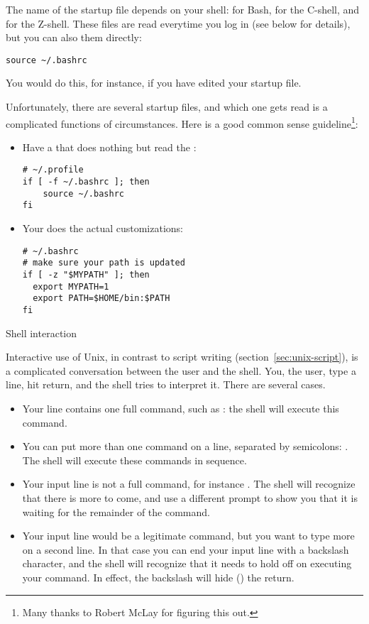 The name of the startup file depends on your shell:
 for Bash,
 for the C-shell, and
 for the Z-shell.
These files are read everytime you log in (see below for details),
but you can also  them directly:
\begin{lstlisting}
source ~/.bashrc
\end{lstlisting}
You would do this, for instance, if you have edited your startup file.

Unfortunately, there are several startup files, and which one gets read
is a complicated functions of circumstances. Here is a good common sense
guideline\footnote{Many thanks to Robert McLay for figuring this out.}:
\begin{itemize}
\item Have a  that does nothing but read the :
\begin{lstlisting}
# ~/.profile
if [ -f ~/.bashrc ]; then
    source ~/.bashrc
fi
\end{lstlisting}
\item Your  does the actual customizations:
\begin{lstlisting}
# ~/.bashrc
# make sure your path is updated
if [ -z "$MYPATH" ]; then
  export MYPATH=1
  export PATH=$HOME/bin:$PATH
fi
\end{lstlisting}
\end{itemize}


 {Shell interaction}

Interactive use of Unix, in contrast to script writing
(section~\ref{sec:unix-script}), is a complicated conversation between
the user and the shell. You, the user, type a line, hit return, and
the shell tries to interpret it. There are several cases.
\begin{itemize}
\item Your line contains one full command, such as : the
  shell will execute this command.
\item You can put more than one command on a line, separated by
  semicolons: . The shell will execute these
  commands in sequence.
\item Your input line is not a full command, for instance . The shell will recognize that there is more to come, and use
  a different prompt to show you that it is waiting for the remainder
  of the command.
\item Your input line would be a legitimate command, but you want to
  type more on a second line. In that case you can end your input line
  with a backslash character, and the shell will recognize that it
  needs to hold off on executing your command. In effect, the
  backslash will hide () the return.
\end{itemize}

